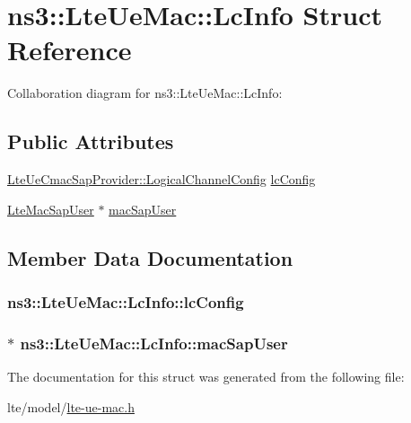 \hypertarget{structns3_1_1LteUeMac_1_1LcInfo}{}\section{ns3\+:\+:Lte\+Ue\+Mac\+:\+:Lc\+Info Struct Reference}
\label{structns3_1_1LteUeMac_1_1LcInfo}


Collaboration diagram for ns3\+:\+:Lte\+Ue\+Mac\+:\+:Lc\+Info\+:
\subsection*{Public Attributes}
\begin{DoxyCompactItemize}
\item 
\hyperlink{structns3_1_1LteUeCmacSapProvider_1_1LogicalChannelConfig}{Lte\+Ue\+Cmac\+Sap\+Provider\+::\+Logical\+Channel\+Config} \hyperlink{structns3_1_1LteUeMac_1_1LcInfo_a6f18397734c0be3290463bbab29c655f}{lc\+Config}
\item 
\hyperlink{classns3_1_1LteMacSapUser}{Lte\+Mac\+Sap\+User} $\ast$ \hyperlink{structns3_1_1LteUeMac_1_1LcInfo_a8364a2ddb6739831c490276fc647e8d9}{mac\+Sap\+User}
\end{DoxyCompactItemize}


\subsection{Member Data Documentation}
\subsubsection[{\texorpdfstring{lc\+Config}{lcConfig}}]{ ns3\+::\+Lte\+Ue\+Mac\+::\+Lc\+Info\+::lc\+Config}\hypertarget{structns3_1_1LteUeMac_1_1LcInfo_a6f18397734c0be3290463bbab29c655f}{}\label{structns3_1_1LteUeMac_1_1LcInfo_a6f18397734c0be3290463bbab29c655f}
\subsubsection[{\texorpdfstring{mac\+Sap\+User}{macSapUser}}]{$\ast$ ns3\+::\+Lte\+Ue\+Mac\+::\+Lc\+Info\+::mac\+Sap\+User}\hypertarget{structns3_1_1LteUeMac_1_1LcInfo_a8364a2ddb6739831c490276fc647e8d9}{}\label{structns3_1_1LteUeMac_1_1LcInfo_a8364a2ddb6739831c490276fc647e8d9}


The documentation for this struct was generated from the following file\+:\begin{DoxyCompactItemize}
\item 
lte/model/\hyperlink{lte-ue-mac_8h}{lte-\/ue-\/mac.\+h}\end{DoxyCompactItemize}
